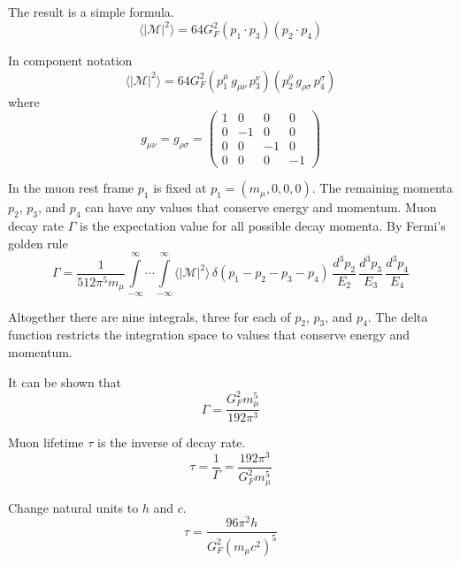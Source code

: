 The result is a simple formula.
\begin{equation*}
\langle|\mathcal{M}|^2\rangle=64G_F^2(p_1\cdot p_3)(p_2\cdot p_4)
\end{equation*}

In component notation
\begin{equation*}
\langle|\mathcal{M}|^2\rangle=64G_F^2
(p_1^\mu \, g_{\mu\nu} \, p_3^\nu)
(p_2^\rho \, g_{\rho\sigma} \, p_4^\sigma)
\end{equation*}
where
\begin{equation*}
g_{\mu\nu}=g_{\rho\sigma}=\begin{pmatrix}
1 & 0 & 0 & 0\\
0 & -1 & 0 & 0\\
0 & 0 & -1 & 0\\
0 & 0 & 0 & -1
\end{pmatrix}
\end{equation*}

In the muon rest frame $p_1$ is fixed at $p_1=(m_\mu,0,0,0)$.
The remaining momenta $p_2$, $p_3$, and $p_4$ can have any values that conserve energy and momentum.
Muon decay rate $\Gamma$ is the expectation value for all possible decay momenta.
By Fermi's golden rule
\begin{equation*}
\Gamma=\frac{1}{512\pi^5m_\mu}
\int\limits_{-\infty}^\infty \cdots \int\limits_{-\infty}^\infty
\langle|\mathcal{M}|^2\rangle
\,\delta(p_1-p_2-p_3-p_4)
\,\frac{d^3p_2}{E_2}\,\frac{d^3p_3}{E_3}\,\frac{d^3p_4}{E_4}
\end{equation*}

Altogether there are nine integrals, three for each of $p_2$, $p_3$, and $p_4$.
The delta function restricts the integration space to values that conserve energy and momentum.

\bigskip
It can be shown that
\begin{equation*}
\Gamma=\frac{G_F^2 m_\mu^5}{192\pi^3}
\end{equation*}

Muon lifetime $\tau$ is the inverse of decay rate.
\begin{equation*}
\tau=\frac{1}{\Gamma}=\frac{192\pi^3}{G_F^2 m_\mu^5}
\end{equation*}

Change natural units to $h$ and $c$.
\begin{equation*}
\tau=\frac{96\pi^2h}{G_F^2\left(m_\mu c^2\right)^5}
\end{equation*}


